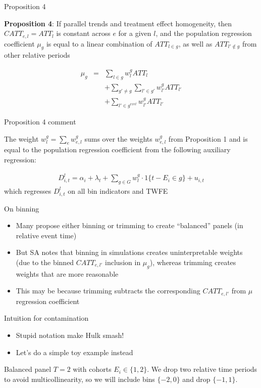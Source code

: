 \documentclass{beamer}
\begin{document}
\begin{frame}{Proposition 4}

\textbf{Proposition 4}: If parallel trends and treatment effect homogeneity, then $CATT_{e,l}=ATT_l$ is constant across $e$ for a given $l$, and the population regression coefficient $\mu_g$ is equal to a linear combination of $ATT_{l \in g}$, as well as $ATT_{l' \notin g}$ from other relative periods

\begin{eqnarray*}
\mu_g &=& \sum_{l \in g} w^g_l ATT_l \\
&&+ \sum_{g' \neq g} \sum_{l' \in g'} w^g_{l'} ATT_{l'} \\
&&+ \sum_{l' \in g^{excl}} w^g_{l'}ATT_{l'}
\end{eqnarray*}


\end{frame}

\begin{frame}{Proposition 4 comment}

The weight $w^g_l = \sum_ew^g_{e,l}$ sums over the weights $w^g_{e,l}$ from Proposition 1 and is equal to the population regression coefficient from the following auxiliary regression:

\begin{eqnarray*}
D^l_{i,t} = \alpha_i + \lambda_t + \sum_{g \in G} w^g_l \cdot 1\{t-E_i \in g \} + u_{i,t}
\end{eqnarray*}which regresses $D^l_{i,t}$ on all bin indicators and TWFE

\end{frame}

\begin{frame}{On binning}

\begin{itemize}
\item Many propose either binning or trimming to create ``balanced'' panels (in relative event time)
\item But SA notes that binning in simulations creates uninterpretable weights (due to the binned $CATT_{e,l'}$ inclusion in $\mu_g$), whereas trimming creates weights that are more reasonable
\item This may be because trimming subtracts the corresponding $CATT_{e,l'}$ from $\mu$ regression coefficient
\end{itemize}

\end{frame}

\begin{frame}{Intuition for contamination}

\begin{itemize}
\item Stupid notation make Hulk smash!
\item Let's do a simple toy example instead
\end{itemize}

\bigskip

Balanced panel $T=2$ with cohorts $E_i \in \{1,2 \}$. We drop two relative time periods to avoid multicollinearity, so we will include bins $\{-2,0\}$ and drop $\{-1,1\}$. 


\end{frame}
\end{document}
